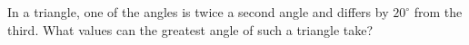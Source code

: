 In a triangle, one of the angles is twice a second angle and differs by $20^\circ$ from the third. What values can the greatest angle of such a triangle take?
